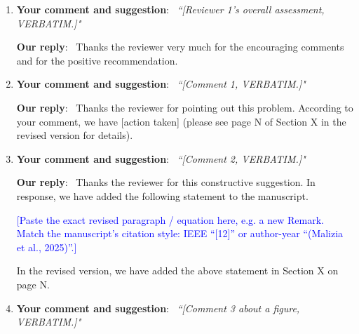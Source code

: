 \documentclass[letter,onecolumn,11pt]{IEEEtran}
\begin{document}
\vspace{2ex}
\begin{enumerate}[1)]
\item[0)] \textbf{Your comment and suggestion}: \ \textit{``[Reviewer 1's overall assessment, VERBATIM.]"}

\vspace{2ex}
\textbf{Our reply}: \ Thanks the reviewer very much for the encouraging comments and for the positive recommendation.

\vspace{2ex}
\item[1)] \textbf{Your comment and suggestion}: \ \textit{``[Comment 1, VERBATIM.]"}

\vspace{2ex} \textbf{Our reply}: \ Thanks the reviewer for pointing out this problem. According to your comment, we have [action taken] (please see page N of Section X in the revised version for details).

\vspace{2ex}
\item[2)] \textbf{Your comment and suggestion}: \ \textit{``[Comment 2, VERBATIM.]"}

\vspace{2ex} \textbf{Our reply}: \ Thanks the reviewer for this constructive suggestion. In response, we have added the following statement to the manuscript.

\vspace{2ex}
\textcolor{blue}{[Paste the exact revised paragraph / equation here, e.g. a new Remark.
Match the manuscript's citation style: IEEE ``[12]'' or author-year ``(Malizia et al., 2025)''.]}

\vspace{2ex}
In the revised version, we have added the above statement in Section X on page N.

\vspace{2ex}
\item[3)] \textbf{Your comment and suggestion}: \ \textit{``[Comment 3 about a figure, VERBATIM.]"}


\end{enumerate}
\end{document}
